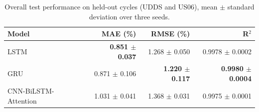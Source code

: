 \begin{table}[t]
\centering
\caption{Overall test performance on held-out cycles (UDDS and US06), mean $\pm$ standard deviation over three seeds.}
\label{tab:overall}
\begin{tabular}{lrrr}
\toprule
Model & MAE (\%) & RMSE (\%) & R$^2$ \\
\midrule
LSTM & \textbf{0.851 $\pm$ 0.037} & 1.268 $\pm$ 0.050 & 0.9978 $\pm$ 0.0002 \\
GRU & 0.871 $\pm$ 0.106 & \textbf{1.220 $\pm$ 0.117} & \textbf{0.9980 $\pm$ 0.0004} \\
CNN-BiLSTM-Attention & 1.031 $\pm$ 0.041 & 1.368 $\pm$ 0.031 & 0.9975 $\pm$ 0.0001 \\
\bottomrule
\end{tabular}
\end{table}